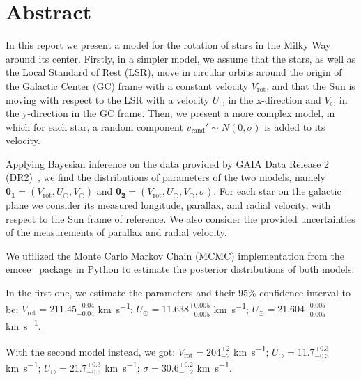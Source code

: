 \section*{Abstract}
In this report we present a model for the rotation of stars in the Milky Way around its center.
Firstly, in a simpler model, we assume that the stars, as well as the Local Standard of Rest (LSR), 
move in circular orbits around the origin of the Galactic Center (GC) frame with a constant velocity $V_{\text{rot}}$, and that the Sun is moving with respect to the LSR with a velocity $U_{\odot}$ in the x-direction and $V_{\odot}$ in the y-direction in the GC frame. 
Then, we present a more complex model, in which for each star, a random component $v_{\text{rand}}' \sim N(0, \sigma)$ is added to its velocity.

Applying Bayesian inference on the data provided by GAIA Data Release 2 (DR2)~\cite{GAIADR2}, we find the distributions of parameters of the two models, namely $\mathbf{\theta_1} = (V_{\text{rot}}, U_{\odot}, V_{\odot})$ and $\mathbf{\theta_2} = (V_{\text{rot}}, U_{\odot}, V_{\odot}, \sigma)$.
For each star on the galactic plane we consider its measured longitude, parallax, and radial velocity, with respect to the Sun frame of reference.
We also consider the provided uncertainties of the measurements of parallax and radial velocity.

We utilized the Monte Carlo Markov Chain (MCMC) implementation from the emcee~\cite{EMCEE} package in Python to estimate the posterior distributions of both models.

In the first one, we estimate the parameters and their 95\% confidence interval to be: %
$V_{\text{rot}} = 211.45_{-0.04}^{+0.04}$ \unit{\kilo\meter\per\second};  
$U_{\odot} = 11.638_{-0.005}^{+0.005}$ \unit{\kilo\meter\per\second};  
$U_{\odot} = 21.604_{-0.005}^{+0.005}$ \unit{\kilo\meter\per\second}.  

With the second model instead, we got:  
$V_{\text{rot}} = 204_{-2}^{+2}$ \unit{\kilo\meter\per\second};  
$U_{\odot} = 11.7_{-0.3}^{+0.3}$ \unit{\kilo\meter\per\second};  
$U_{\odot} = 21.7_{-0.3}^{+0.3}$ \unit{\kilo\meter\per\second};  
$\sigma = 30.6_{-0.2}^{+0.2}$ \unit{\kilo\meter\per\second}.  


